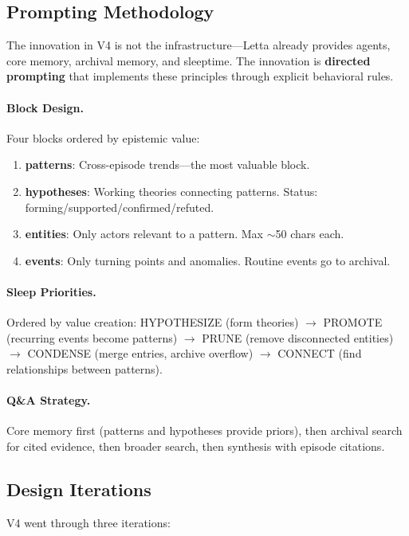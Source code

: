 \documentclass[11pt,letterpaper]{article}
\begin{document}
\subsection{Prompting Methodology}

The innovation in V4 is not the infrastructure---Letta already provides agents, core memory, archival memory, and sleeptime. The innovation is \textbf{directed prompting} that implements these principles through explicit behavioral rules.

\paragraph{Block Design.} Four blocks ordered by epistemic value:
\begin{enumerate}[nosep]
  \item \textbf{patterns}: Cross-episode trends---the most valuable block.
  \item \textbf{hypotheses}: Working theories connecting patterns. Status: forming/\allowbreak supported/\allowbreak confirmed/\allowbreak refuted.
  \item \textbf{entities}: Only actors relevant to a pattern. Max \mbox{$\sim$50} chars each.
  \item \textbf{events}: Only turning points and anomalies. Routine events go to archival.
\end{enumerate}

\paragraph{Sleep Priorities.} Ordered by value creation:
HYPOTHESIZE (form theories) $\to$
PROMOTE (recurring events become patterns) $\to$
PRUNE (remove disconnected entities) $\to$
CONDENSE (merge entries, archive overflow) $\to$
CONNECT (find relationships between patterns).

\paragraph{Q\&A Strategy.} Core memory first (patterns and hypotheses provide priors), then archival search for cited evidence, then broader search, then synthesis with episode citations.

\subsection{Design Iterations}

V4 went through three iterations:
\end{document}
